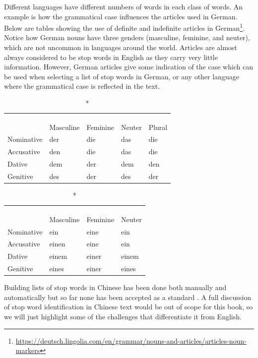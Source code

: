\documentclass[
]{krantz}
\DeclareRobustCommand{\href}[2]{#2\footnote{\url{#1}}}
\renewcommand{\href}[2]{#2\footnote{\url{#1}}}
\begin{document}
Different languages have different numbers of words in each class of words. An example is how the grammatical case influences the articles used in German. Below are tables showing the use of \href{https://deutsch.lingolia.com/en/grammar/nouns-and-articles/articles-noun-markers}{definite and indefinite articles in German}. Notice how German nouns have three genders (masculine, feminine, and neuter), which are not uncommon in languages around the world. Articles are almost always considered to be stop words in English as they carry very little information. However, German articles give some indication of the case which can be used when selecting a list of stop words in German, or any other language where the grammatical case is reflected in the text.

\captionsetup[table]{labelformat=empty,skip=1pt}
\begin{longtable}{lllll}
\caption*{
\large German Definite Articles (the)\\ 
\small \\ 
} \\ 
\toprule
 & Masculine & Feminine & Neuter & Plural \\ 
\midrule
Nominative & der & die & das & die \\ 
Accusative & den & die & das & die \\ 
Dative & dem & der & dem & den \\ 
Genitive & des & der & des & der \\ 
\bottomrule
\end{longtable}

\captionsetup[table]{labelformat=empty,skip=1pt}
\begin{longtable}{llll}
\caption*{
\large German Indefinite Articles (a/an)\\ 
\small \\ 
} \\ 
\toprule
 & Masculine & Feminine & Neuter \\ 
\midrule
Nominative & ein & eine & ein \\ 
Accusative & einen & eine & ein \\ 
Dative & einem & einer & einem \\ 
Genitive & eines & einer & eines \\ 
\bottomrule
\end{longtable}

Building lists of stop words in Chinese has been done both manually and automatically \citep{Zou2006ACC} but so far none has been accepted as a standard \citep{Zou2006}. A full discussion of stop word identification in Chinese text would be out of scope for this book, so we will just highlight some of the challenges that differentiate it from English.
\end{document}
